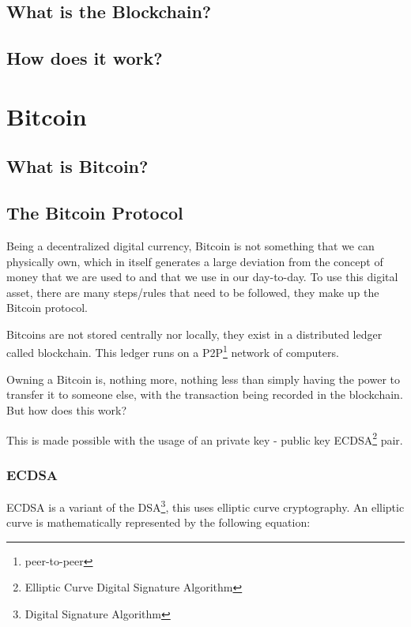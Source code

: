 \documentclass{article}
\newcommand\tab[1][1cm]{\hspace*{#1}}
\begin{document}
\subsection{What is the Blockchain?}

\subsection{How does it work?}



\section{Bitcoin}

\subsection{What is Bitcoin?}

\subsection{The Bitcoin Protocol}

\tab Being a decentralized digital currency, Bitcoin is not something that we can physically own, which in itself generates a large deviation from the concept of money that we are used to and that we use in our day-to-day. To use this digital asset, there are many steps/rules that need to be followed, they make up the Bitcoin protocol.

Bitcoins are not stored centrally nor locally, they exist in a distributed ledger called blockchain. This ledger runs on a P2P\footnote{peer-to-peer} network of computers. 

Owning a Bitcoin is, nothing more, nothing less than simply having the power to transfer it to someone else, with the transaction being recorded in the blockchain. But how does this work?

This is made possible with the usage of an private key - public key ECDSA\footnote{Elliptic Curve Digital Signature Algorithm} pair.

\subsubsection{ECDSA}

\tab ECDSA is a variant of the DSA\footnote{Digital Signature Algorithm}, this uses elliptic curve cryptography. An elliptic curve is mathematically represented by the following equation:
\end{document}
